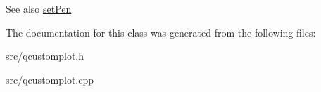 \begin{DoxySeeAlso}{See also}
\hyperlink{classQCPItemBracket_ab13001d9cc5d8f9e56ea15bdda682acb}{set\+Pen} 
\end{DoxySeeAlso}


The documentation for this class was generated from the following files\+:\begin{DoxyCompactItemize}
\item 
src/qcustomplot.\+h\item 
src/qcustomplot.\+cpp\end{DoxyCompactItemize}
